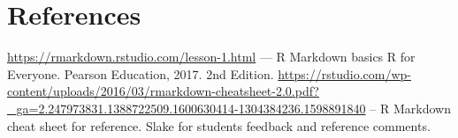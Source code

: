 \documentclass[
]{article}
\begin{document}
\hypertarget{references}{%
\section{References}\label{references}}

\url{https://rmarkdown.rstudio.com/lesson-1.html} --- R Markdown basics
R for Everyone. Pearson Education, 2017. 2nd Edition.
\url{https://rstudio.com/wp-content/uploads/2016/03/rmarkdown-cheatsheet-2.0.pdf?_ga=2.247973831.1388722509.1600630414-1304384236.1598891840}
-- R Markdown cheat sheet for reference. Slake for students feedback and
reference comments.
\end{document}
